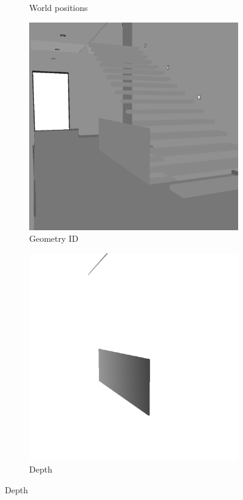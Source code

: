 \begin{figure}
\begin{subfigure}[t]{0.24\linewidth}
		\caption{World positions}
		\label{worldpos_scenepass2}
	\end{subfigure}
	\begin{subfigure}[t]{0.24\linewidth}
		\includegraphics[width=\textwidth]{chapters/chapter_thetool/worldposa_scenepass2}
		\caption{Geometry ID}
		\label{worldposa_scenepass2}
	\end{subfigure}
	\begin{subfigure}[t]{0.24\linewidth}
		\includegraphics[width=\textwidth]{chapters/chapter_thetool/depth_scenepass2}
		\caption{Depth}
		\label{depth_scenepass2}
	\end{subfigure}


\end{figure}
